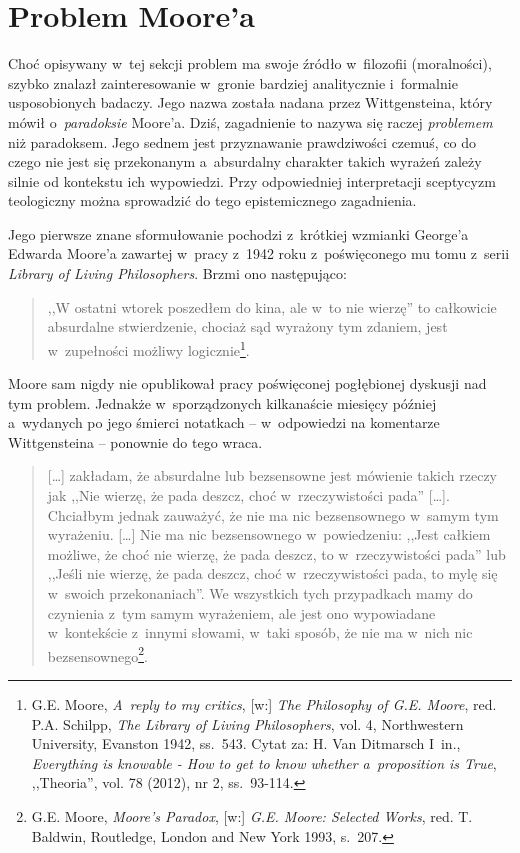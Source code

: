\section{Problem Moore'a}\label{scep-par-problemmoorea}

Choć opisywany w~tej sekcji problem ma swoje źródło w~filozofii (moralności), szybko znalazł zainteresowanie w~gronie bardziej analitycznie i~formalnie usposobionych badaczy. Jego nazwa została nadana przez Wittgensteina, który mówił o~\textit{paradoksie} Moore'a. Dziś, zagadnienie to nazywa się raczej \textit{problemem} niż paradoksem. Jego sednem jest przyznawanie prawdziwości czemuś, co do czego nie jest się przekonanym a~absurdalny charakter takich wyrażeń zależy silnie od kontekstu ich wypowiedzi. Przy odpowiedniej interpretacji sceptycyzm teologiczny można sprowadzić do tego epistemicznego zagadnienia.

Jego pierwsze znane sformułowanie pochodzi z~krótkiej wzmianki George'a Edwarda Moore'a zawartej w~pracy z~1942 roku z~poświęconego mu tomu z~serii \textit{Library of Living Philosophers}. Brzmi ono następująco:

\begin{quote}
,,W ostatni wtorek poszedłem do kina, ale w~to nie wierzę'' to całkowicie absurdalne stwierdzenie, chociaż sąd wyrażony tym zdaniem, jest w~zupełności możliwy logicznie\footnote{G.E. Moore, \textit{A~reply to my critics}, [w:] \textit{The Philosophy of G.E. Moore}, red. P.A. Schilpp, \textit{The Library of Living} \textit{Philosophers}, vol. 4, Northwestern University, Evanston 1942, ss.~543. Cytat za: H. Van Ditmarsch I~in., \textit{Everything is knowable - How to get to know whether a~proposition is True}, ,,Theoria'', vol. 78 (2012), nr 2, ss.~93-114.}.
\end{quote}

Moore sam nigdy nie opublikował pracy poświęconej pogłębionej dyskusji nad tym problem. Jednakże w~sporządzonych kilkanaście miesięcy później a~wydanych po jego śmierci notatkach -- w~odpowiedzi na komentarze Wittgensteina -- ponownie do tego wraca.

\begin{quote}
[…] zakładam, że absurdalne lub bezsensowne jest mówienie takich rzeczy jak ,,Nie wierzę, że pada deszcz, choć w~rzeczywistości pada'' […]. Chciałbym jednak zauważyć, że nie ma nic bezsensownego w~samym tym wyrażeniu. […] Nie ma nic bezsensownego w~powiedzeniu: ,,Jest całkiem możliwe, że choć nie wierzę, że pada deszcz, to w~rzeczywistości pada'' lub ,,Jeśli nie wierzę, że pada deszcz, choć w~rzeczywistości pada, to mylę się w~swoich przekonaniach''. We wszystkich tych przypadkach mamy do czynienia z~tym samym wyrażeniem, ale jest ono wypowiadane w~kontekście z~innymi słowami, w~taki sposób, że nie ma w~nich nic bezsensownego\footnote{G.E. Moore, \textit{Moore's Paradox}, [w:] \textit{G.E. Moore: Selected Works}, red. T. Baldwin, Routledge, London and New York 1993, s.~207.}.
\end{quote}

